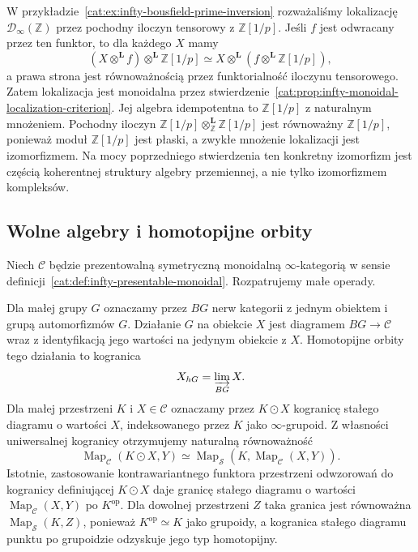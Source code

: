 \begin{przyklad}\label{cat:ex:infty-monoidal-localization-prime}
W przykładzie~\ref{cat:ex:infty-bousfield-prime-inversion} rozważaliśmy lokalizację $\mathcal D_\infty(\mathbb Z)$ przez pochodny iloczyn tensorowy z $\mathbb Z[1/p]$. Jeśli $f$ jest odwracany przez ten funktor, to dla każdego $X$ mamy
\[
 (X\otimes^{\mathbf L}f)\otimes^{\mathbf L}\mathbb Z[1/p]
 \simeq X\otimes^{\mathbf L}(f\otimes^{\mathbf L}\mathbb Z[1/p]),
\]
a prawa strona jest równoważnością przez funktorialność iloczynu tensorowego. Zatem lokalizacja jest monoidalna przez stwierdzenie~\ref{cat:prop:infty-monoidal-localization-criterion}. Jej algebra idempotentna to $\mathbb Z[1/p]$ z naturalnym mnożeniem. Pochodny iloczyn $\mathbb Z[1/p]\otimes^{\mathbf L}_{\mathbb Z}\mathbb Z[1/p]$ jest równoważny $\mathbb Z[1/p]$, ponieważ moduł $\mathbb Z[1/p]$ jest płaski, a zwykłe mnożenie lokalizacji jest izomorfizmem. Na mocy poprzedniego stwierdzenia ten konkretny izomorfizm jest częścią koherentnej struktury algebry przemiennej, a nie tylko izomorfizmem kompleksów.
\end{przyklad}

\subsection{Wolne algebry i homotopijne orbity}

Niech $\mathcal C$ będzie prezentowalną symetryczną monoidalną $\infty$-kategorią w sensie definicji~\ref{cat:def:infty-presentable-monoidal}. Rozpatrujemy małe operady.

\begin{definicja}\label{cat:def:infty-homotopy-orbits}
Dla małej grupy $G$ oznaczamy przez $BG$ nerw kategorii z jednym obiektem i grupą automorfizmów $G$. Działanie $G$ na obiekcie $X$ jest diagramem $BG\to\mathcal C$ wraz z identyfikacją jego wartości na jedynym obiekcie z $X$. Homotopijne orbity tego działania to kogranica
\[
 X_{hG}=\varinjlim_{BG}X.
\]
Dla małej przestrzeni $K$ i $X\in\mathcal C$ oznaczamy przez $K\odot X$ kogranicę stałego diagramu o wartości $X$, indeksowanego przez $K$ jako $\infty$-grupoid. Z własności uniwersalnej kogranicy otrzymujemy naturalną równoważność
\[
 \operatorname{Map}_{\mathcal C}(K\odot X,Y)
 \simeq\operatorname{Map}_{\mathcal S}(K,\operatorname{Map}_{\mathcal C}(X,Y)).
\]
Istotnie, zastosowanie kontrawariantnego funktora przestrzeni odwzorowań do kogranicy definiującej $K\odot X$ daje granicę stałego diagramu o wartości $\operatorname{Map}_{\mathcal C}(X,Y)$ po $K^{\mathrm{op}}$. Dla dowolnej przestrzeni $Z$ taka granica jest równoważna $\operatorname{Map}_{\mathcal S}(K,Z)$, ponieważ $K^{\mathrm{op}}\simeq K$ jako grupoidy, a kogranica stałego diagramu punktu po grupoidzie odzyskuje jego typ homotopijny.
\end{definicja}

